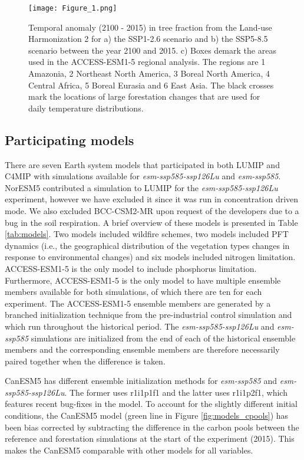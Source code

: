 \documentclass[draft]{agujournal2019}
\begin{document}
\begin{figure}
    \texttt{[image: Figure\_1.png]}
    \caption{Temporal anomaly (2100 - 2015) in tree fraction from the Land-use Harmonization 2 for a) the SSP1-2.6 scenario and b) the SSP5-8.5 scenario between the year 2100 and 2015. c) Boxes demark the areas used in the ACCESS-ESM1-5 regional analysis. The regions are 1 Amazonia, 2 Northeast North America, 3 Boreal North America, 4 Central Africa, 5 Boreal Eurasia and 6 East Asia. The black crosses mark the locations of large forestation changes that are used for daily temperature distributions.}
    \label{fig:land_use}
\end{figure}

\subsection{Participating models}

There are seven Earth system models that participated in both LUMIP and C4MIP with simulations available for \textit{esm-ssp585-ssp126Lu} and \textit{esm-ssp585}.
NorESM5 contributed a simulation to LUMIP for the \textit{esm-ssp585-ssp126Lu} experiment, however we have excluded it since it was run in concentration driven mode.
We also excluded BCC-CSM2-MR upon request of the developers due to a bug in the soil respiration.
A brief overview of these models is presented in Table \ref{tab:models}.
Two models included wildfire schemes, two models included PFT dynamics (i.e., the geographical distribution of the vegetation types changes in response to environmental changes) and six models included nitrogen limitation.
ACCESS-ESM1-5 is the only model to include phosphorus limitation.
Furthermore, ACCESS-ESM1-5 is the only model to have multiple ensemble members available for both simulations, of which there are ten for each experiment.
The ACCESS-ESM1-5 ensemble members are generated by a branched initialization technique from the pre-industrial control simulation and which run throughout the historical period.
The \textit{esm-ssp585-ssp126Lu} and \textit{esm-ssp585} simulations are initialized from the end of each of the historical ensemble members and the corresponding ensemble members are therefore necessarily paired together when the difference is taken.

CanESM5 has different ensemble initialization methods for \textit{esm-ssp585} and \textit{esm-ssp585-ssp126Lu}.
The former uses r1i1p1f1 and the latter uses r1i1p2f1, which features recent bug-fixes in the model.
To account for the slightly different initial conditions, the CanESM5 model (green line in Figure \ref{fig:models_cpools}) has been bias corrected by subtracting the difference in the carbon pools between the reference and forestation simulations at the start of the experiment (2015).
This makes the CanESM5 comparable with other models for all variables.
\end{document}
